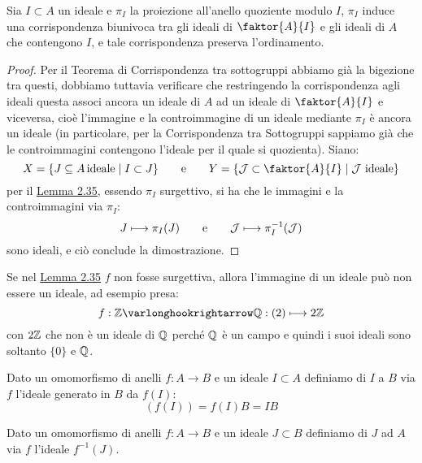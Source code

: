 \documentclass[11pt]{scrartcl}
\begin{document}
\begin{theorem}
    \label{corrispondenza}
    Sia $I \subset A$ un ideale e $\pi_I$ la proiezione all'anello quoziente modulo $I$, $\pi_I$ induce una corrispondenza biunivoca tra gli ideali di $\faktor{A}{I}$ e 
    gli ideali di $A$ che contengono $I$, e tale corrispondenza preserva l'ordinamento.
\end{theorem}

\begin{proof}
Per il Teorema di Corrispondenza tra sottogruppi abbiamo già la bigezione tra questi, dobbiamo tuttavia verificare che restringendo la corrispondenza agli ideali  questa associ ancora un 
ideale di $A$ ad un ideale di $\faktor{A}{I}$ e viceversa, cioè l'immagine e la controimmagine di un ideale mediante $\pi_I$ è ancora un ideale (in particolare, per la Corrispondenza tra Sottogruppi sappiamo già
che le controimmagini contengono l'ideale per il quale si quozienta). Siano:
    \[ X = \{J \subseteq A \, \text{ideale} \mid I \subset J\} \qquad \text e \qquad Y=\left\{\mathcal{J} \subset \faktor{A}{I} \mid \text{$\mathcal{J}$ ideale}\right\}
        \]
per il \hyperref[2.35]{Lemma 2.35}, essendo $\pi_I$ surgettivo, si ha che le immagini e la controimmagini via $\pi_I$:
    \[ J \longmapsto \pi_I(J) \qquad \text e \qquad \mathcal{J} \longmapsto \pi_{I}^{-1}(\mathcal{J})
        \]
sono ideali, e ciò conclude la dimostrazione.
\end{proof}

\begin{example}
    Se nel \hyperref[2.35]{Lemma 2.35} $f$ non fosse surgettiva, allora l'immagine di un ideale può non essere un ideale, ad esempio presa:
        \[ f : \ZZ \varlonghookrightarrow \QQ : (2) \longmapsto 2\ZZ
            \]
    con $2\mathbb Z$ che non è un ideale di $\mathbb Q$ perché $\mathbb Q$ è un campo e quindi i suoi ideali sono soltanto $\{0\}$ e $\mathbb Q$.
\end{example}

\begin{definition}
    Dato un omomorfismo di anelli $f: A \longrightarrow B$ e un ideale $I \subset A$ definiamo  di $I$ a $B$ via $f$ l'ideale generato in $B$ da $f(I)$:
        \[ (f(I)) = f(I)B = IB
            \]
\end{definition}

\begin{definition}
    Dato un omomorfismo di anelli $f: A \longrightarrow B$ e un ideale $J \subset B$ definiamo  di $J$ ad $A$ via $f$ l'ideale $f^{-1}(J)$.
\end{definition}
\end{document}
